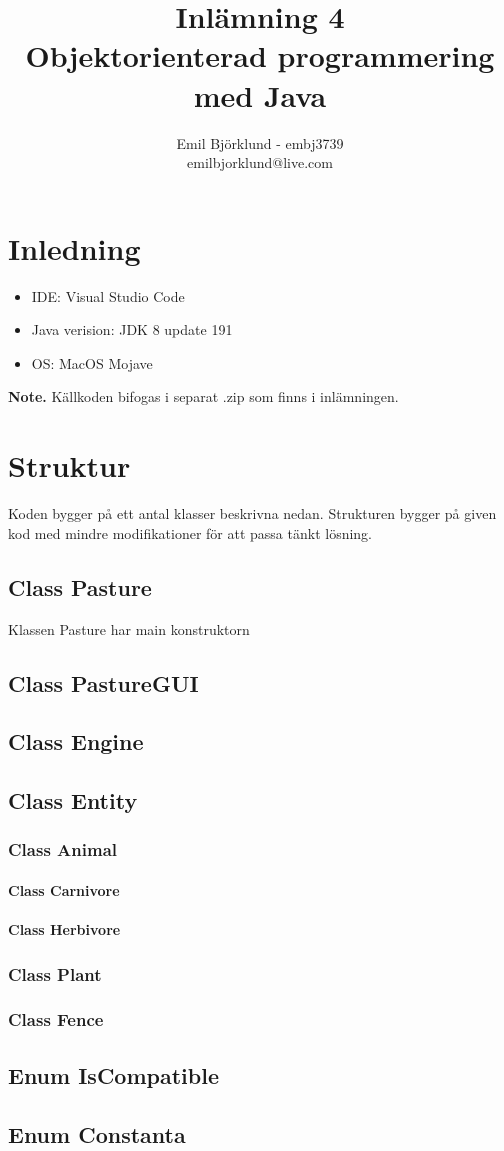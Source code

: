 \documentclass{article}
\title{Inlämning 4 \\ Objektorienterad programmering med Java}
\author{Emil Björklund - embj3739 \\ emilbjorklund@live.com}
\begin{document}
\maketitle 
\newpage

\section{Inledning}
\begin {itemize}
\item IDE: Visual Studio Code
\item Java verision: JDK 8 update 191
\item OS: MacOS Mojave
\end{itemize}

\textbf{Note.} Källkoden bifogas i separat .zip som finns i inlämningen.

\section{Struktur}
Koden bygger på ett antal klasser beskrivna nedan. Strukturen bygger på given kod med mindre modifikationer för att passa tänkt lösning.
\subsection{Class Pasture}
Klassen Pasture har main konstruktorn 
\subsection{Class PastureGUI}
\subsection{Class Engine}
\subsection{Class Entity}
\subsubsection{Class Animal}
\paragraph{Class Carnivore}
\paragraph{Class Herbivore}
\subsubsection{Class Plant}
\subsubsection{Class Fence}
\subsection{Enum IsCompatible}
\subsection{Enum Constanta}
\end{document}
